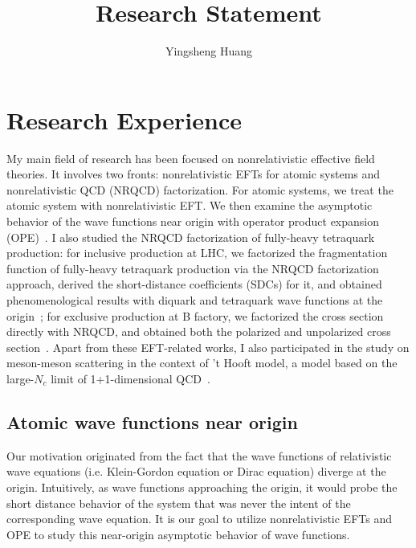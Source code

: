 \documentclass[letterpaper,11pt]{article}
\title{Research Statement}
\author{Yingsheng Huang}
\date{}
\begin{document}
\maketitle


\section*{Research Experience}
My main field of research has been focused on nonrelativistic effective field theories. It involves two fronts: nonrelativistic EFTs for atomic systems and nonrelativistic QCD (NRQCD) factorization. For atomic systems, we treat the atomic system with nonrelativistic EFT. We then examine the asymptotic behavior of the wave functions near origin with operator product expansion (OPE)~\cite{Huang2018,Huang2018a,Huang2019}. I also studied the NRQCD factorization of fully-heavy tetraquark production: for inclusive production at LHC, we factorized the fragmentation function of fully-heavy tetraquark production via the NRQCD factorization approach, derived the short-distance coefficients (SDCs) for it, and obtained phenomenological results with diquark and tetraquark wave functions at the origin~\cite{Feng2020}; for exclusive production at B factory, we factorized the cross section directly with NRQCD, and obtained both the polarized and unpolarized cross section~\cite{Feng2020a}. Apart from these EFT-related works, I also participated in the study on meson-meson scattering in the context of 't Hooft model, a model based on the large-$N_c$ limit of 1+1-dimensional QCD~\cite{Chen2019}.
\subsection*{Atomic wave functions near origin}
Our motivation originated from the fact that the wave functions of relativistic wave equations (i.e. Klein-Gordon equation or Dirac equation) diverge at the origin. Intuitively, as wave functions approaching the origin, it would probe the short distance behavior of the system that was never the intent of the corresponding wave equation. It is our goal to utilize nonrelativistic EFTs and OPE to study this near-origin asymptotic behavior of wave functions.
\end{document}

